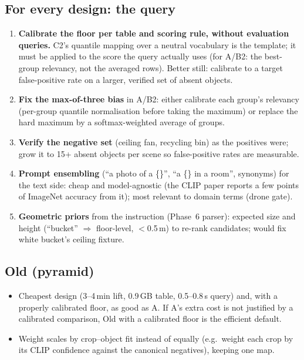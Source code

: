 \documentclass[11pt,a4paper]{article}
\begin{document}
\subsection{For every design: the query}
\begin{enumerate}
  \item \textbf{Calibrate the floor per table and scoring rule, without evaluation queries.} C2's quantile mapping over a
        neutral vocabulary is the template; it must be applied to the score the query actually uses (for A/B2: the
        best-group relevancy, not the averaged rows). Better still: calibrate to a target false-positive rate on a
        larger, verified set of absent objects.
  \item \textbf{Fix the max-of-three bias} in A/B2: either calibrate each group's relevancy (per-group quantile
        normalisation before taking the maximum) or replace the hard maximum by a softmax-weighted average of groups.
  \item \textbf{Verify the negative set} (ceiling fan, recycling bin) as the positives were; grow it to 15+ absent
        objects per scene so false-positive rates are measurable.
  \item \textbf{Prompt ensembling} (``a photo of a \{\}'', ``a \{\} in a room'', synonyms) for the text side: cheap and
        model-agnostic (the CLIP paper reports a few points of ImageNet accuracy from it); most relevant to domain terms (drone gate).
  \item \textbf{Geometric priors} from the instruction (Phase~6 parser): expected size and height (``bucket'' $\Rightarrow$
        floor-level, $<$0.5\,m) to re-rank candidates; would fix white bucket's ceiling fixture.
\end{enumerate}

\subsection{Old (pyramid)}
\begin{itemize}
  \item Cheapest design (3--4\,min lift, 0.9\,GB table, 0.5--0.8\,s query) and, with a properly calibrated floor, as good as
        A. If A's extra cost is not justified by a calibrated comparison, Old with a calibrated floor is the efficient
        default.
  \item Weight scales by crop--object fit instead of equally (e.g.\ weight each crop by its CLIP confidence against the
        canonical negatives), keeping one map.
\end{itemize}
\end{document}
